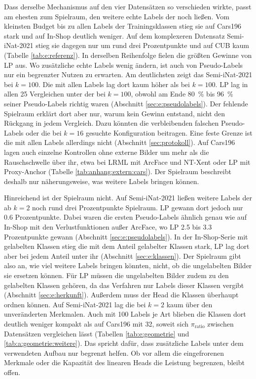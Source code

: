 Dass derselbe Mechanismus auf den vier Datensätzen so verschieden wirkte, passt am ehesten zum Spielraum, den weitere echte Labels der \UEBL noch ließen. Vom kleinsten Budget bis zu allen Labels der Trainingsklassen stieg sie auf Cars196 stark und auf In-Shop deutlich weniger. Auf dem komplexeren Datensatz Semi-iNat-2021 stieg sie dagegen nur um rund drei Prozentpunkte und auf \ac{CUB} kaum (Tabelle \ref{tab:e:referenz}). In derselben Reihenfolge fielen die größten Gewinne von \ac{LP} aus. Wo zusätzliche echte Labels wenig ändern, ist auch von Pseudo-Labels nur ein begrenzter Nutzen zu erwarten. Am deutlichsten zeigt das Semi-iNat-2021 bei $k=100$. Die \UEBL mit allen Labels lag dort kaum höher als bei $k=100$. \ac{LP} lag in allen 25 Vergleichen unter der \UEBL bei $k=100$, obwohl am Ende \qty{80}{\percent} bis \qty{96}{\percent} seiner Pseudo-Labels richtig waren (Abschnitt \ref{sec:e:pseudolabels}). Der fehlende Spielraum erklärt dort aber nur, warum kein Gewinn entstand, nicht den Rückgang in jedem Vergleich. Dazu könnten die verbleibenden falschen Pseudo-Labels oder die bei $k=16$ gesuchte Konfiguration beitragen. Eine feste Grenze ist die \UEBL mit allen Labels allerdings nicht (Abschnitt \ref{sec:protokoll}). Auf Cars196 lagen auch einzelne Kontrollen ohne externe Bilder um mehr als die Rauschschwelle über ihr, etwa bei \ac{LRML} mit ArcFace und \ac{NT-Xent} oder \ac{LP} mit Proxy-Anchor (Tabelle \ref{tab:anhang:extern:cars}). Der Spielraum beschreibt deshalb nur näherungsweise, was weitere Labels bringen können. 

Hinreichend ist der Spielraum nicht. Auf Semi-iNat-2021 ließen weitere Labels der \UEBL ab $k=2$ noch rund drei Prozentpunkte Spielraum. \ac{LP} gewann dort jedoch nur \num{0.6} Prozentpunkte. Dabei waren die ersten Pseudo-Labels ähnlich genau wie auf In-Shop mit den Verlustfunktionen außer ArcFace, wo \ac{LP} \num{2.5} bis \num{3.3} Prozentpunkte gewann (Abschnitt \ref{sec:e:pseudolabels}). In der In-Shop-Serie mit gelabelten Klassen stieg die \UEBL mit dem Anteil gelabelter Klassen stark, \ac{LP} lag dort aber bei jedem Anteil unter ihr (Abschnitt \ref{sec:e:klassen}). Der Spielraum gibt also an, wie viel weitere Labels bringen könnten, nicht, ob die ungelabelten Bilder sie ersetzen können. Für \ac{LP} müssen die ungelabelten Bilder zudem zu den gelabelten Klassen gehören, da das Verfahren nur Labels dieser Klassen vergibt (Abschnitt \ref{sec:e:herkunft}). Außerdem muss der Head die Klassen überhaupt ordnen können. Auf Semi-iNat-2021 lag die \UEBL bei $k=2$ kaum über den unveränderten Merkmalen. Auch mit 100 Labels je Art blieben die Klassen dort deutlich weniger kompakt als auf Cars196 mit 32, soweit sich $\pi_{\mathrm{ratio}}$ zwischen Datensätzen vergleichen lässt (Tabellen \ref{tab:e:geometrie} und \ref{tab:a:geometrie:weitere}). Das spricht dafür, dass zusätzliche Labels unter dem verwendeten Aufbau nur begrenzt helfen. Ob vor allem die eingefrorenen Merkmale oder die Kapazität des linearen Heads die Leistung begrenzen, bleibt offen.

